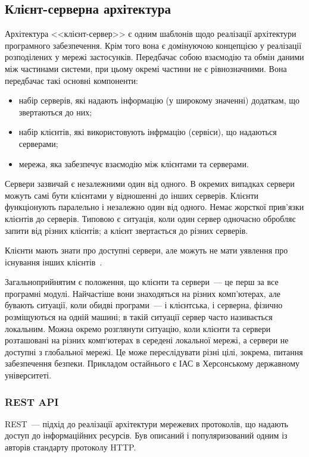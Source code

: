 \subsection{Клієнт-серверна архітектура}
Архітектура <<клієнт-сервер>> є одним шаблонів щодо реалізації архітектури програмного забезпечення. Крім того вона є домінуючою концепцією у реалізації розподілених у мережі застосунків. Передбачає собою взаємодію та обмін даними між частинами системи, при цьому окремі частини не є рівнозначними. Вона передбачає такі основні компоненти:
\begin{itemize}
	\item набір серверів, які надають інформацію (у широкому значенні) додаткам, що звертаються до них;
	\item набір клієнтів, які використовують інфрмацію (сервіси), що надаються серверами;
	\item мережа, яка забезпечує взаємодію між клієнтами та серверами.
\end{itemize}

Сервери зазвичай є незалежними один від одного. В окремих випадках сервери можуть самі бути клієнтами у відношенні до інших серверів. Клієнти функціонують паралельно і незалежно один від одного. Немає жорсткої прив'язки клієнтів до серверів. Типовою є ситуація, коли один сервер одночасно обробляє запити від різних клієнтів; а клієнт звертається до різних серверів.

Клієнти мають знати про доступні сервери, але можуть не мати уявлення про існування інших клієнтів~\cite{douglowe1997}.

Загальноприйнятим є положення, що клієнти та сервери~--- це перш за все програмні модулі. Найчастіше вони знаходяться на різних комп'ютерах, але бувають ситуації, коли обидві програми~--- і клієнтська, і серверна, фізично розміщуються на одній машині; в такій ситуації сервер часто називається локальним. Можна окремо розглянути ситуацію, коли клієнти та сервери розташовані на різних комп`ютерах в середені локальної мережі, а сервери не доступні з глобальної мережі. Це може переслідувати різні цілі, зокрема, питання забезпечення безпеки. Прикладом остайнього є ІАС в Херсонському державному університеті. 


\subsubsection{REST API}
REST~--- підхід до реалізації архітектури мережевих протоколів, що надають доступ до інформаційних ресурсів. Був описаний і популяризований одним із авторів стандарту протоколу HTTP. 

